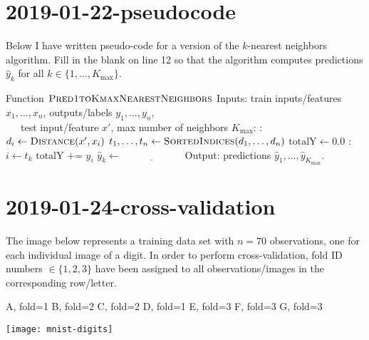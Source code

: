 \documentclass{article}
\begin{document}
\newpage
\section{2019-01-22-pseudocode}
Below I have written pseudo-code for a version of the $k$-nearest
neighbors algorithm. Fill in the blank on line 12 so that the
algorithm computes predictions $\hat y_k$ for all
$k\in\{1,\dots, K_{\text{max}}\}$.

\begin{algorithmic}[1]
  \State Function $\textsc{Pred1toKmaxNearestNeighbors}$
  \State Inputs: train inputs/features $x_1,\dots,x_n$, outputs/labels $y_1,\dots,y_n$,\\ \ \ \ test input/feature $x'$, max number of neighbors $K_{\text{max}}$:
  :
  \State $d_i\gets \textsc{Distance}(x', x_i)$
  \EndFor
  \State $t_1,\dots,t_n\gets \textsc{SortedIndices}(d_1,\dots,d_n)$
  \State $\text{totalY}\gets 0.0$
  :
  \State $i\gets t_k$
  \State $\text{totalY} \texttt{ += } y_i$
  \State $\hat y_k\gets \underline{\hspace{1in}}$
  \EndFor
  \State Output: predictions $\hat y_1, \dots, \hat y_{K_\text{max}}$.
\end{algorithmic}

\newpage
\section{2019-01-24-cross-validation}
The image below represents a training data set with $n=70$
observations, one for each individual image of a digit. In order to
perform cross-validation, fold ID numbers $\in\{1,2,3\}$ have been
assigned to all observations/images in the corresponding row/letter.


\newcommand{\myskip}{\vskip 0.8cm}
\parbox{0.1\textwidth}{
A, fold=1
\myskip
B, fold=2
\myskip
C, fold=2
\myskip
D, fold=1
\myskip
E, fold=3
\myskip
F, fold=3
\myskip
G, fold=3
}
\parbox{0.9\textwidth}{
  \texttt{[image: mnist-digits]}
}
\end{document}
